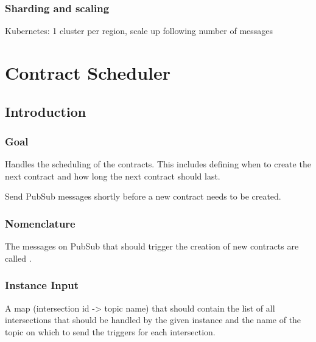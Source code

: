 \documentclass[letterpaper,10pt,english]{sphinxmanual}
\begin{document}
\subsubsection{Sharding and scaling}
\label{\detokenize{microservices/contract_maker/improvements:sharding-and-scaling}}
Kubernetes: 1 cluster per region, scale up following number of messages


\section{Contract Scheduler}
\label{\detokenize{microservices/contract_scheduler/index:contract-scheduler}}\label{\detokenize{microservices/contract_scheduler/index::doc}}

\subsection{Introduction}
\label{\detokenize{microservices/contract_scheduler/introduction:introduction}}\label{\detokenize{microservices/contract_scheduler/introduction::doc}}

\subsubsection{Goal}
\label{\detokenize{microservices/contract_scheduler/introduction:goal}}
Handles the scheduling of the contracts.
This includes defining when to create the next contract and how long the next contract should last.

Send PubSub messages shortly before a new contract needs to be created.


\subsubsection{Nomenclature}
\label{\detokenize{microservices/contract_scheduler/introduction:nomenclature}}
The messages on PubSub that should trigger the creation of new contracts are called .


\subsubsection{Instance Input}
\label{\detokenize{microservices/contract_scheduler/introduction:instance-input}}
A map (intersection id -\textgreater{} topic name) that should contain the list of all intersections that should be handled by the given instance and the name of the topic on which to send the triggers for each intersection.
\end{document}
